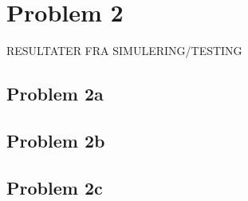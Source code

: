 \chapter{Problem 2}
RESULTATER FRA SIMULERING/TESTING

\section{Problem 2a}

\section{Problem 2b}

\section{Problem 2c}
